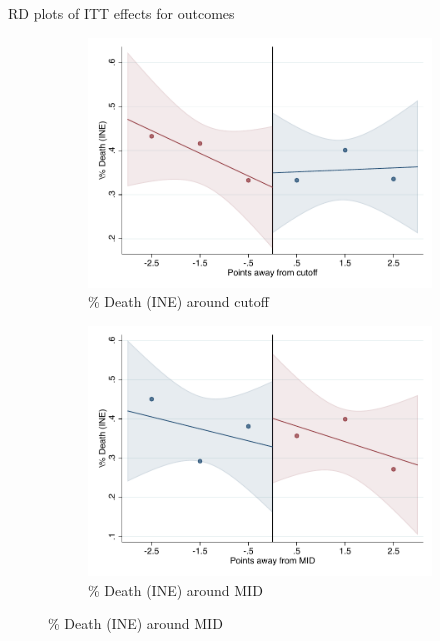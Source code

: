 \documentclass[notes,11pt, aspectratio=169]{beamer}
\begin{document}
\begin{frame}{RD plots of ITT effects for outcomes}
\hyperlink{ITT_rd_plot_IPN}{}
\begin{figure}

    \begin{subfigure}{0.45\textwidth}
        \centering
        \caption{\% Death (INE) around cutoff}
        \includegraphics[width=\textwidth]{04_Figures/rd_plot_tau_Death_INE_IPN3.pdf}
    \end{subfigure}
    \begin{subfigure}{0.45\textwidth}
        \centering
        \caption{\% Death (INE) around MID}
        \includegraphics[width=\textwidth]{04_Figures/rd_plot_mid_Death_INE_IPN3.pdf}
    \end{subfigure}
    
\end{figure}
\end{frame}
\end{document}
